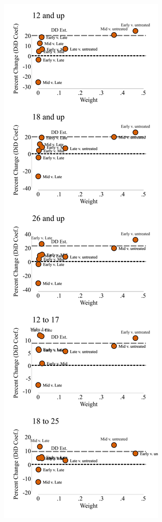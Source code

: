 \documentclass[12pt]{article}%
\begin{document}
\begin{appendices}
\begin{figure}
\begin{minipage}{.9\linewidth}
\begin{subfigure}[b]{0.32\columnwidth}
    \includegraphics[width=\linewidth]{../output/plots/bacon_weights_ln_mj_use_365.pdf}

\end{subfigure}
\end{minipage}
\end{figure}
\end{appendices}
\end{document}
